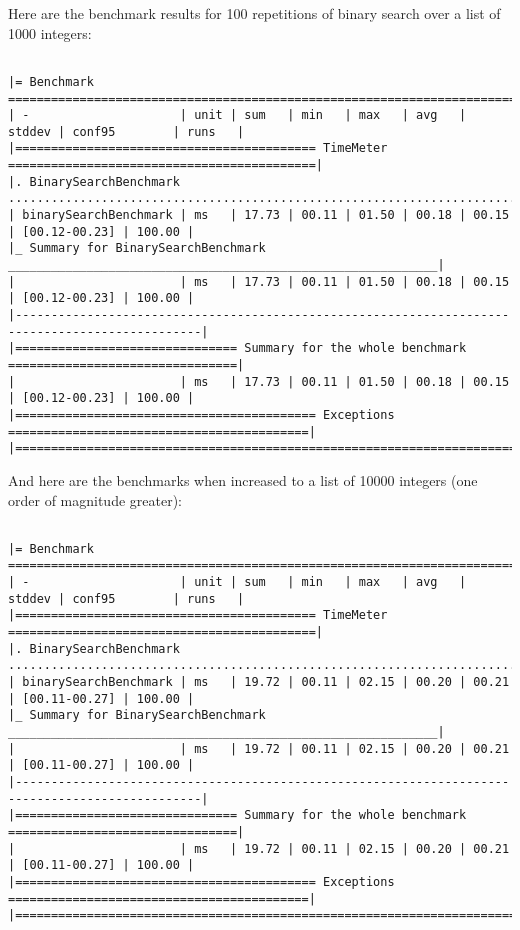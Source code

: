 \documentclass{article}
\begin{document}
Here are the benchmark results for 100 repetitions of binary search over a list of 1000 integers:

\begingroup
\fontsize{8pt}{8pt}\selectfont
\begin{verbatim}

|= Benchmark ====================================================================================|
| -                     | unit | sum   | min   | max   | avg   | stddev | conf95        | runs   |
|========================================== TimeMeter ===========================================|
|. BinarySearchBenchmark ........................................................................|
| binarySearchBenchmark | ms   | 17.73 | 00.11 | 01.50 | 00.18 | 00.15  | [00.12-00.23] | 100.00 |
|_ Summary for BinarySearchBenchmark ____________________________________________________________|
|                       | ms   | 17.73 | 00.11 | 01.50 | 00.18 | 00.15  | [00.12-00.23] | 100.00 |
|------------------------------------------------------------------------------------------------|
|=============================== Summary for the whole benchmark ================================|
|                       | ms   | 17.73 | 00.11 | 01.50 | 00.18 | 00.15  | [00.12-00.23] | 100.00 |
|========================================== Exceptions ==========================================|
|================================================================================================|

\end{verbatim}
\endgroup

And here are the benchmarks when increased to a list of 10000 integers (one order of magnitude greater):

\begingroup
\fontsize{8pt}{8pt}\selectfont
\begin{verbatim}

|= Benchmark ====================================================================================|
| -                     | unit | sum   | min   | max   | avg   | stddev | conf95        | runs   |
|========================================== TimeMeter ===========================================|
|. BinarySearchBenchmark ........................................................................|
| binarySearchBenchmark | ms   | 19.72 | 00.11 | 02.15 | 00.20 | 00.21  | [00.11-00.27] | 100.00 |
|_ Summary for BinarySearchBenchmark ____________________________________________________________|
|                       | ms   | 19.72 | 00.11 | 02.15 | 00.20 | 00.21  | [00.11-00.27] | 100.00 |
|------------------------------------------------------------------------------------------------|
|=============================== Summary for the whole benchmark ================================|
|                       | ms   | 19.72 | 00.11 | 02.15 | 00.20 | 00.21  | [00.11-00.27] | 100.00 |
|========================================== Exceptions ==========================================|
|================================================================================================|

\end{verbatim}
\endgroup
\end{document}
